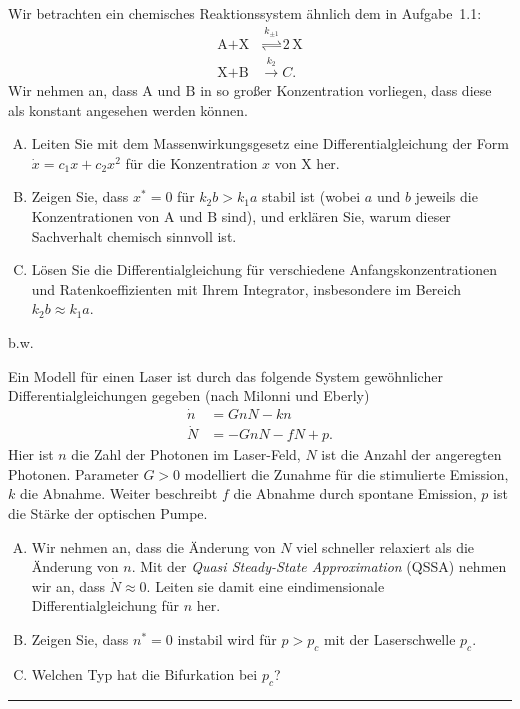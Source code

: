 \documentclass[11pt,a4paper]{article}
\begin{document}
\begin{aufg}
 Wir betrachten ein chemisches Reaktionssystem ähnlich dem in Aufgabe~1.1:
 \begin{align*}
  \textrm{A} + \textrm{X} &\stackrel{k_{\pm 1}}{\rightleftharpoons} 2\, \textrm{X} \\
  \textrm{X} + \textrm{B} &\stackrel{k_{2}}{\rightarrow} C.
 \end{align*}
 Wir nehmen an, dass $\textrm{A}$ und $\textrm{B}$ in so großer Konzentration
 vorliegen, dass diese als konstant angesehen werden können.
 \begin{enumerate}[A)]
  \item Leiten Sie mit dem Massenwirkungsgesetz eine Differentialgleichung der
        Form $\dot{x} = c_1 x + c_2 x^2$ für die Konzentration $x$ von
        $\textrm{X}$ her.
  \item Zeigen Sie, dass $x^*=0$ für $k_2 b > k_1 a$ stabil ist (wobei $a$ und $b$
        jeweils die Konzentrationen von $\textrm{A}$ und $\textrm{B}$ sind), und
        erklären Sie, warum dieser Sachverhalt chemisch sinnvoll ist.
  \item Lösen Sie die Differentialgleichung für verschiedene
        Anfangskonzentrationen und Ratenkoeffizienten mit Ihrem Integrator,
        insbesondere im Bereich $k_2 b\approx k_1 a$.
 \end{enumerate}
\end{aufg}


\bigskip\vfill\begin{flushright}b.w.\end{flushright}\pagebreak

\begin{aufg}[Laserschwelle]
 Ein Modell für einen Laser ist durch das folgende System gewöhnlicher
 Differentialgleichungen gegeben (nach Milonni und Eberly)
 \begin{align*}
  \dot{n} &= GnN - kn \\
  \dot{N} &= -GnN - fN + p.
 \end{align*}
 Hier ist $n$ die Zahl der Photonen im Laser-Feld, $N$ ist die Anzahl der
 angeregten Photonen. Parameter $G>0$ modelliert die Zunahme für die stimulierte
 Emission, $k$ die Abnahme. Weiter beschreibt $f$ die Abnahme durch spontane
 Emission, $p$ ist die Stärke der optischen Pumpe.
 \begin{enumerate}[A)]
  \item Wir nehmen an, dass die Änderung von $N$ viel schneller relaxiert als
        die Änderung von $n$. Mit der
        \emph{Quasi Steady-State Approximation} (QSSA) nehmen wir an, dass
        $\dot{N} \approx 0$. Leiten sie damit eine eindimensionale
        Differentialgleichung für $n$ her.
  \item Zeigen Sie, dass $n^*=0$ instabil wird für $p>p_c$ mit der
        Laserschwelle $p_c$.
  \item Welchen Typ hat die Bifurkation bei $p_c$?
 \end{enumerate}

 
\end{aufg}


\bigskip
\hrule

\end{document}
